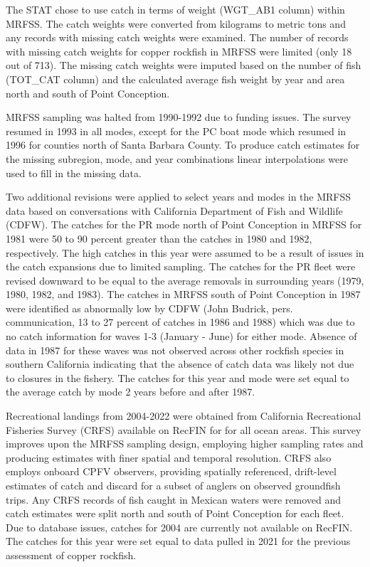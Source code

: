 \documentclass[11pt,
  english,
  letterpaper,
]{article}
\begin{document}
The STAT chose to use catch in terms of weight (WGT\_AB1 column) within MRFSS. The catch weights were converted from kilograms to metric tons and any records with missing catch weights were examined. The number of records with missing catch weights for copper rockfish in MRFSS were limited (only 18 out of 713). The missing catch weights were imputed based on the number of fish (TOT\_CAT column) and the calculated average fish weight by year and area north and south of Point Conception.

MRFSS sampling was halted from 1990-1992 due to funding issues. The survey resumed in 1993 in all modes, except for the PC boat mode which resumed in 1996 for counties north of Santa Barbara County. To produce catch estimates for the missing subregion, mode, and year combinations linear interpolations were used to fill in the missing data.

Two additional revisions were applied to select years and modes in the MRFSS data based on conversations with California Department of Fish and Wildlife (CDFW). The catches for the PR mode north of Point Conception in MRFSS for 1981 were 50 to 90 percent greater than the catches in 1980 and 1982, respectively. The high catches in this year were assumed to be a result of issues in the catch expansions due to limited sampling. The catches for the PR fleet were revised downward to be equal to the average removals in surrounding years (1979, 1980, 1982, and 1983). The catches in MRFSS south of Point Conception in 1987 were identified as abnormally low by CDFW (John Budrick, pers. communication, 13 to 27 percent of catches in 1986 and 1988) which was due to no catch information for waves 1-3 (January - June) for either mode. Absence of data in 1987 for these waves was not observed across other rockfish species in southern California indicating that the absence of catch data was likely not due to closures in the fishery. The catches for this year and mode were set equal to the average catch by mode 2 years before and after 1987.

Recreational landings from 2004-2022 were obtained from California Recreational Fisheries Survey (CRFS) available on RecFIN for for all ocean areas. This survey improves upon the MRFSS sampling design, employing higher sampling rates and producing estimates with finer spatial and temporal resolution. CRFS also employs onboard CPFV observers, providing spatially referenced, drift-level estimates of catch and discard for a subset of anglers on observed groundfish trips. Any CRFS records of fish caught in Mexican waters were removed and catch estimates were split north and south of Point Conception for each fleet. Due to database issues, catches for 2004 are currently not available on RecFIN. The catches for this year were set equal to data pulled in 2021 for the previous assessment of copper rockfish.
\end{document}
